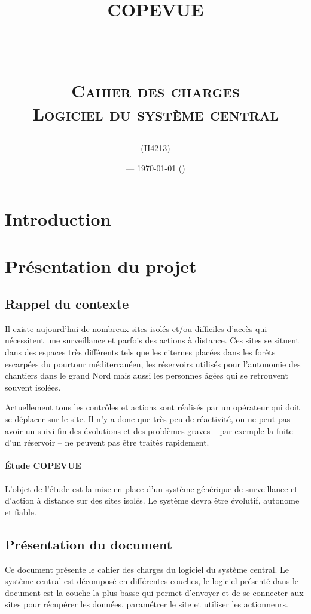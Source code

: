 \documentclass[a4paper, 11pt, final]{article}
\title{\textbf{COPEVUE}\\
\rule{\textwidth}{1pt}{}\\
\Huge{\textsc{Cahier des charges\\Logiciel du système central}}}
\author{\docauthor{} (H4213)}
\date{\docname{} --- \today{} (\docstatus{})}
\begin{document}
\maketitle

\tableofcontents

\pagebreak

\section{Introduction}

\section{Présentation du projet}

\subsection{Rappel du contexte}
Il existe aujourd'hui de nombreux sites isolés et/ou difficiles d'accès qui nécessitent
une surveillance et parfois des actions à distance. Ces sites se situent dans des espaces
très différents tels que les citernes placées dans les forêts escarpées du pourtour
méditerranéen, les réservoirs utilisés pour l'autonomie des chantiers dans le grand Nord
mais aussi les personnes âgées qui se retrouvent souvent isolées.

Actuellement tous les contrôles et actions sont réalisés par un opérateur qui doit
se déplacer sur le site. Il n'y a donc que très peu de réactivité, on ne peut pas
avoir un suivi fin des évolutions et des problèmes graves -- par exemple la fuite
d'un réservoir -- ne peuvent pas être traités rapidement.

\paragraph{Étude COPEVUE}
L'objet de l'étude est la mise en place d'un système générique de surveillance
et d'action à distance sur des sites isolés. Le système devra être évolutif, autonome et fiable.

\subsection{Présentation du document}
Ce document présente le cahier des charges du logiciel du système central.
Le système central est décomposé en différentes couches, le logiciel présenté dans
le document est la couche la plus basse qui permet d'envoyer et de se connecter aux
sites pour récupérer les données, paramétrer le site et utiliser les actionneurs.
\end{document}
